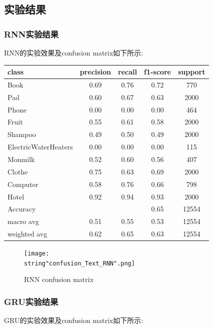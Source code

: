 \documentclass[UTF8]{ctexart}
\begin{document}
\subsection{实验结果}
\subsubsection{RNN实验结果}
RNN的实验效果及confusion matrix如下所示:\par

\begin{tabular}{|l|c|c|c|c|} %
    \hline 
    class & precision & recall & f1-score & support\\
    \hline 
    Book &0.69&0.76&0.72&770\\
    Pad &0.60&0.67&0.63&2000\\
    Phone &0.00&0.00&0.00&464\\
    Fruit &0.55&0.61&0.58&2000\\
    Shampoo &0.49&0.50&0.49&2000\\
    ElectricWaterHeaters &0.00&0.00&0.00&115\\
    Monmilk &0.52&0.60&0.56&407\\
    Clothe &0.75&0.63&0.69&2000\\
    Computer &0.58&0.76&0.66&798\\
    Hotel &0.92&0.94&0.93&2000\\
    Accuracy& &&0.65&12554\\
    macro avg&0.51&0.55&0.53&12554\\
    weighted avg&0.62&0.65&0.63&12554\\
    \hline 
\end{tabular}

\begin{figure}[H]
    \begin{center}
        \texttt{[image: \\string"confusion\_Text\_RNN".png]}
    \caption{RNN confusion matrix}
    \label{fig:8}
    \end{center}
    \end{figure}
\par

\subsubsection{GRU实验结果}
GRU的实验效果及confusion matrix如下所示:\par
\end{document}

